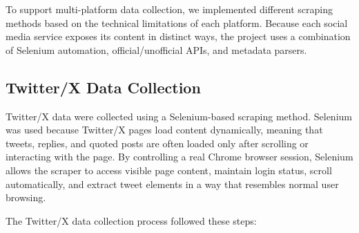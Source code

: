 \documentclass[12pt,oneside,openright,a4paper]{cpe-english-project}
\begin{document}
To support multi-platform data collection, we implemented different scraping methods based on the technical limitations of each platform. Because each social media service exposes its content in distinct ways, the project uses a combination of Selenium automation, official/unofficial APIs, and metadata parsers.

\subsection{Twitter/X Data Collection}

Twitter/X data were collected using a Selenium-based scraping method. Selenium was used because Twitter/X pages load content dynamically, meaning that tweets, replies, and quoted posts are often loaded only after scrolling or interacting with the page. By controlling a real Chrome browser session, Selenium allows the scraper to access visible page content, maintain login status, scroll automatically, and extract tweet elements in a way that resembles normal user browsing.

The Twitter/X data collection process followed these steps:
\end{document}
